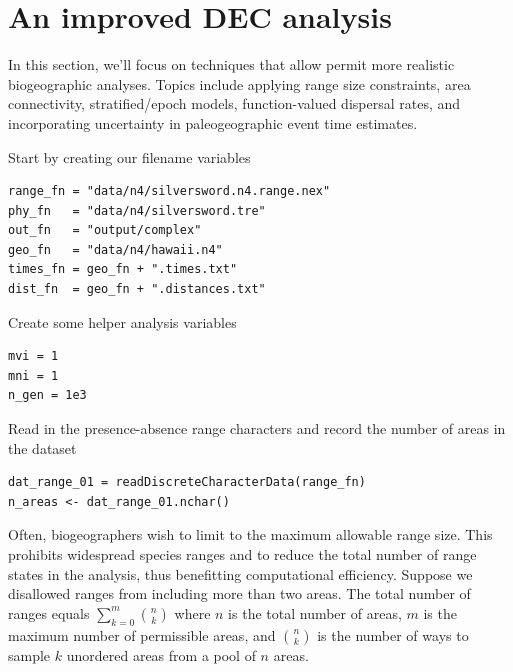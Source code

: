 

\section{An improved DEC analysis}

In this section, we'll focus on techniques that allow permit more realistic biogeographic analyses.
Topics include applying range size constraints, area connectivity, stratified/epoch models, function-valued dispersal rates, and incorporating uncertainty in paleogeographic event time estimates.

Start by creating our filename variables

\begin{snugshade}
\begin{lstlisting}
range_fn = "data/n4/silversword.n4.range.nex"
phy_fn   = "data/n4/silversword.tre"
out_fn   = "output/complex"
geo_fn   = "data/n4/hawaii.n4"
times_fn = geo_fn + ".times.txt"
dist_fn  = geo_fn + ".distances.txt"
\end{lstlisting}
\end{snugshade}

Create some helper analysis variables

\begin{snugshade}
\begin{lstlisting}
mvi = 1
mni = 1
n_gen = 1e3
\end{lstlisting}
\end{snugshade}


Read in the presence-absence range characters and record the number of areas in the dataset

\begin{snugshade}
\begin{lstlisting}
dat_range_01 = readDiscreteCharacterData(range_fn)
n_areas <- dat_range_01.nchar()
\end{lstlisting}
\end{snugshade}

Often, biogeographers wish to limit to the maximum allowable range size.
This prohibits widespread species ranges and to reduce the total number of range states in the analysis, thus benefitting computational efficiency.
Suppose we disallowed ranges from including more than two areas.
The total number of ranges equals $\sum_{k=0}^m {{n}\choose{k}}$ where $n$ is the total number of areas, $m$ is the maximum number of permissible areas, and ${{n}\choose{k}}$ is the number of ways to sample $k$ unordered areas from a pool of $n$ areas.

